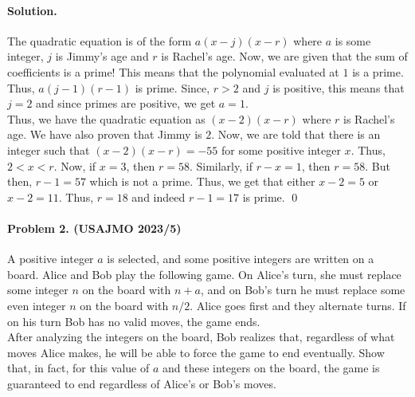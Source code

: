\documentclass[12pt]{article}
\newenvironment{solution}
{\paragraph{Solution.}}
{\qed\eject}
\begin{document}
\begin{solution}
    The quadratic equation is of the form $a(x-j)(x-r)$ where $a$ is some integer, $j$ is Jimmy's age and $r$ is Rachel's age. Now, we are given that the sum of coefficients is a prime! This means that the polynomial evaluated at $1$ is a prime. Thus, $a(j-1)(r-1)$ is prime. Since, $r>2$ and $j$ is positive, this means that $j=2$ and since primes are positive, we get $a=1$.\\

    Thus, we have the quadratic equation as $(x-2)(x-r)$ where $r$ is Rachel's age. We have also proven that Jimmy is $2$. Now, we are told that there is an integer such that $(x-2)(x-r)=-55$ for some positive integer $x$. Thus, $2<x<r$. Now, if $x=3$, then $r=58$. Similarly, if $r-x=1$, then $r=58$. But then, $r-1=57$ which is not a prime. Thus, we get that either $x-2=5$ or $x-2=11$. Thus, $r=18$ and indeed $r-1=17$ is prime.
\end{solution}

\paragraph{\textbf{Problem 2. (USAJMO 2023/5)}} A positive integer $a$ is selected, and some positive integers are written on a board. Alice and Bob play the following game. On Alice's turn, she must replace some integer $n$ on the board with $n+a$, and on Bob's turn he must replace some even integer $n$ on the board with $n/2$. Alice goes first and they alternate turns. If on his turn Bob has no valid moves, the game ends.\\

After analyzing the integers on the board, Bob realizes that, regardless of what moves Alice makes, he will be able to force the game to end eventually. Show that, in fact, for this value of $a$ and these integers on the board, the game is guaranteed to end regardless of Alice's or Bob's moves.
\end{document}
